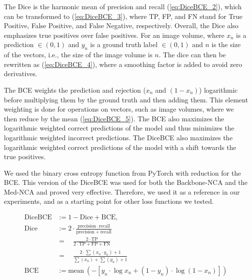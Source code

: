 The Dice is the harmonic mean of precision and recall (\ref{eq:DiceBCE_2}), which can be transformed to (\ref{eq:DiceBCE_3}), where TP, FP, and FN stand for True Positive, False Positive, and False Negative, respectively. Overall, the Dice also emphasizes true positives over false positives. For an image volume, where $x_n$ is a prediction $\in(0,1)$ and $y_n$ is a ground truth label $\in(0,1)$ and $n$ is the size of the vectors, i.e., the size of the image volume is $n$. The dice can then be rewritten as (\ref{eq:DiceBCE_4}), where a smoothing factor is added to avoid zero derivatives.

The BCE weights the prediction and rejection ($x_n$ and $(1-x_n)$) logarithmic before multiplying them by the ground truth and then adding them. This element weighting is done for operations on vectors, such as image volumes, where we then reduce by the mean (\ref{eq:DiceBCE_5}). The BCE also maximizes the logarithmic weighted correct predictions of the model and thus minimizes the logarithmic weighted incorrect predictions. The DiceBCE also maximizes the logarithmic weighted correct predictions of the model with a shift towards the true positives.

We used the binary cross entropy function from PyTorch \cite{paszke:2019:pytorch} with reduction for the BCE.
This version of the DiceBCE was used for both the Backbone-NCA and the Med-NCA and proved very effective. Therefore, we used it as a reference in our experiments, and as a starting point for other loss functions we tested.

\begin{align}
    \mathrm{DiceBCE}    &:= 1 - \mathrm{Dice} + \mathrm{BCE},           \label{eq:DiceBCE_1}\\[10pt]
    \mathrm{Dice}       &:= 2 \cdot \frac{\mathrm{precision} \cdot \mathrm{recall}}
                                            {\mathrm{precision} + \mathrm{recall}}          \label{eq:DiceBCE_2}\\[10pt]
                        &= \quad \frac{2 \cdot \mathrm{TP}}
                                   {2 \cdot \mathrm{TP} + \mathrm{FP} + \mathrm{FN}}        \label{eq:DiceBCE_3}\\[10pt]
                        &= \quad \frac{2 \cdot {\sum(x_n \cdot y_n)} +1}
                                   {\sum(x_n) + \sum(y_n) +1}                               \label{eq:DiceBCE_4}\\[10pt]
   \mathrm{BCE}         &:= \mathrm{mean}\ ( -[y_n \cdot \log x_n + (1-y_n) \cdot \log (1-x_n)])        \label{eq:DiceBCE_5}
\end{align}